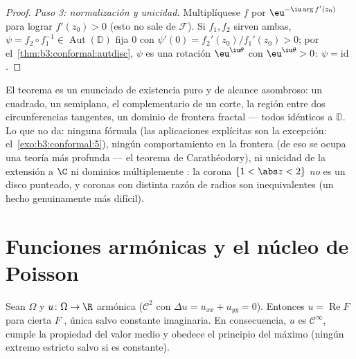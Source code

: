 \begin{proof}
\emph{Paso 3: normalización y unicidad.} Multiplíquese $f$ por
$\eu^{-\iu\arg f'(z_0)}$ para lograr $f'(z_0) > 0$ (esto no sale de
$\mathcal F$). Si $f_1, f_2$ sirven ambas, $\psi =
f_2\circ f_1^{-1} \in \operatorname{Aut}(\mathbb D)$ fija $0$ con
$\psi'(0) = f_2'(z_0)/f_1'(z_0) > 0$; por
el~\cref{thm:b3:conformal:autdisc}, $\psi$ es una rotación
$\eu^{\iu\theta}$ con $\eu^{\iu\theta} > 0$: $\psi =
\mathrm{id}$.
\end{proof}

\begin{remark}\label{rem:b3:conformal:rmtscope}
El teorema es un enunciado de existencia puro y de alcance asombroso: un
cuadrado, un semiplano, el complementario de un corte, la región entre
dos circunferencias tangentes, un dominio de frontera fractal --- todos
 idénticos a
$\mathbb D$. Lo que no da: ninguna fórmula (las aplicaciones explícitas
son la excepción: el~\cref{exo:b3:conformal:5}), ningún comportamiento
en la frontera (de eso se ocupa una teoría más profunda --- el teorema
de Carathéodory), ni unicidad de la extensión a $\C$ ni dominios
múltiplemente : la corona
$\{1 < \abs z < 2\}$ \emph{no} es
 un disco punteado, y
coronas con distinta razón de radios son inequivalentes (un hecho
genuinamente más difícil).
\end{remark}

\section{Funciones armónicas y el núcleo de Poisson}

\begin{proposition}\label{prop:b3:conformal:harmonicholo}
Sean $\Omega$  y $u \colon \Omega \to \R$ armónica
($\mathcal C^2$ con $\Delta u = u_{xx} + u_{yy} = 0$). Entonces $u =
\operatorname{Re}F$ para cierta $F$
, única salvo constante
imaginaria. En consecuencia, $u$ es $\mathcal C^\infty$, cumple la
propiedad del valor medio y obedece el principio del máximo (ningún
extremo  estricto salvo si es
constante).
\end{proposition}

